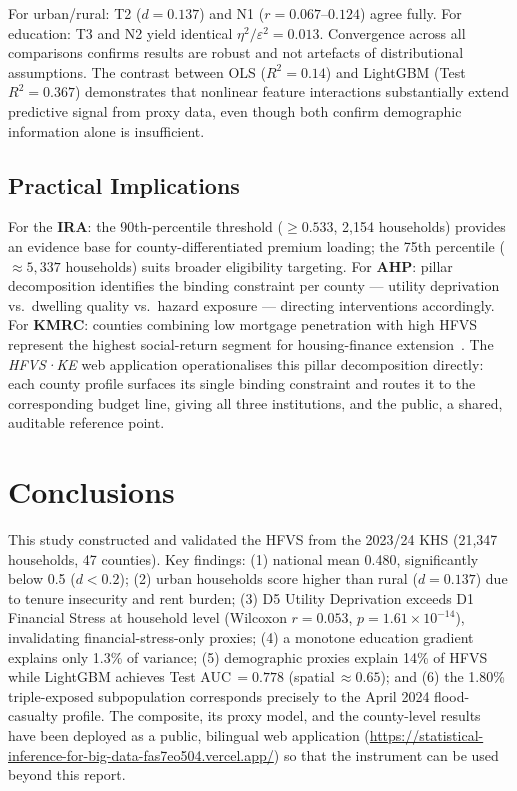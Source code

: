 \documentclass[3p,twocolumn,10pt]{elsarticle}
\begin{document}
For urban/rural: T2 ($d=0.137$) and N1 ($r=0.067$--$0.124$) agree fully. For education:
T3 and N2 yield identical $\eta^2/\varepsilon^2=0.013$. Convergence across all comparisons
confirms results are robust and not artefacts of distributional assumptions. The contrast
between OLS ($R^2=0.14$) and LightGBM (Test $R^2=0.367$) demonstrates that nonlinear
feature interactions substantially extend predictive signal from proxy data, even though
both confirm demographic information alone is insufficient.

\subsection{Practical Implications}

For the \textbf{IRA}: the 90th-percentile threshold ($\geq0.533$, 2,154 households)
provides an evidence base for county-differentiated premium loading; the 75th percentile
($\approx5{,}337$ households) suits broader eligibility targeting. For \textbf{AHP}: pillar
decomposition identifies the binding constraint per county --- utility deprivation vs.\
dwelling quality vs.\ hazard exposure --- directing interventions accordingly. For
\textbf{KMRC}: counties combining low mortgage penetration with high HFVS represent the
highest social-return segment for housing-finance
extension~\cite{abunyewah2022multidimensional,nkeki2023flood}. The \textit{HFVS·KE}
web application operationalises this pillar decomposition directly: each county profile
surfaces its single binding constraint and routes it to the corresponding budget line,
giving all three institutions, and the public, a shared, auditable reference point.

\section{Conclusions}
\label{sec:conclusion}

This study constructed and validated the HFVS from the 2023/24 KHS (21,347 households,
47 counties). Key findings: (1) national mean 0.480, significantly below 0.5 ($d<0.2$);
(2) urban households score higher than rural ($d=0.137$) due to tenure insecurity and rent
burden; (3) D5 Utility Deprivation exceeds D1 Financial Stress at household level (Wilcoxon
$r=0.053$, $p=1.61\times10^{-14}$), invalidating financial-stress-only proxies; (4) a
monotone education gradient explains only 1.3\% of variance; (5) demographic proxies explain
14\% of HFVS while LightGBM achieves Test AUC\,$=0.778$ (spatial\,$\approx0.65$); and (6)
the 1.80\% triple-exposed subpopulation corresponds precisely to the April 2024
flood-casualty profile. The composite, its proxy model, and the county-level results have
been deployed as a public, bilingual web application
(\url{https://statistical-inference-for-big-data-fas7eo504.vercel.app/}) so that the
instrument can be used beyond this report.
\end{document}
